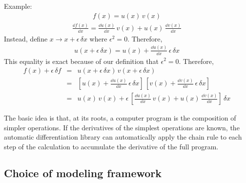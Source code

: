 \documentclass[modern]{aastex62}
\begin{document}
Example:
\begin{eqnarray}
f(x) = u(x)\,v(x)
\end{eqnarray}
\begin{eqnarray}
  \frac{\dd f(x)}{\dd x} = \frac{\dd u(x)}{\dd x}\,v(x) + u(x)\,\frac{\dd v(x)}{\dd x}
\end{eqnarray}
Instead, define $x \to x + \epsilon\,\delta x$ where $\epsilon^2 = 0$.
Therefore,
\begin{eqnarray}
  u(x + \epsilon\,\delta x) = u(x) + \frac{\dd u(x)}{\dd x}\,\epsilon\,\delta x
\end{eqnarray}
This equality is exact because of our definition that $\epsilon^2 = 0$.
Therefore,
\begin{eqnarray}
f(x) + \epsilon\,\delta f &=& u(x + \epsilon\,\delta x)\,v(x + \epsilon\,\delta x) \\
&=& \left[u(x) + \frac{\dd u(x)}{\dd x}\,\epsilon\,\delta x\right]\,
    \left[v(x) + \frac{\dd v(x)}{\dd x}\,\epsilon\,\delta x\right] \\
&=& u(x)\,v(x) + \epsilon\,\left[\frac{\dd u(x)}{\dd x}\,v(x) + u(x)\,\frac{\dd v(x)}{\dd x}\right]\,\delta x
\end{eqnarray}

The basic idea is that, at its roots, a computer program is the composition of simpler operations.
If the derivatives of the simplest operations are known, the automatic differentiation library can automatically apply the chain rule to each step of the calculation to accumulate the derivative of the full program.

\subsection{Choice of modeling framework}
\end{document}

